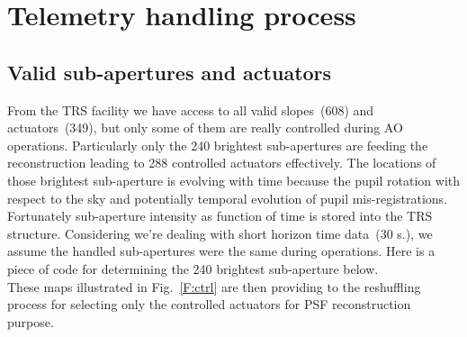 \documentclass[12pt]{article}
\begin{document}
\section{Telemetry handling process}
\subsection{Valid sub-apertures and actuators}

From the TRS facility we have access to all valid slopes~(608) and actuators~(349), but only some of them are really controlled during AO operations. Particularly only the 240 brightest sub-apertures are feeding the reconstruction leading to 288 controlled actuators effectively. The locations of those brightest sub-aperture is evolving with time because the pupil rotation with respect to the sky and potentially temporal evolution of pupil mis-registrations.\\

Fortunately sub-aperture intensity as function of time is stored into the TRS structure. Considering we're dealing with short horizon time data~(30 s.), we assume the handled sub-apertures were the same during operations. Here is a piece of code for determining the 240 brightest sub-aperture below.\\

These maps illustrated in Fig.~\ref{F:ctrl} are then providing to the reshuffling process for selecting only the controlled actuators for PSF reconstruction purpose.
\begin{center}
\end{center}
\end{document}
